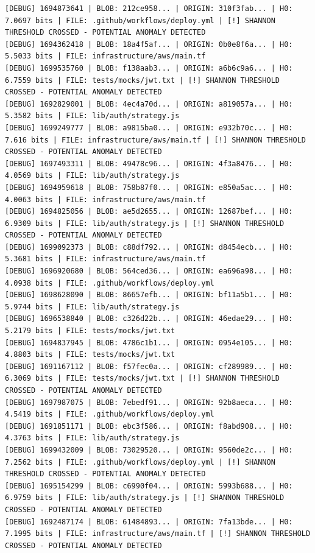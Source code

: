 \documentclass[12pt, a4paper, oneside]{report}
\begin{document}
\begin{lstlisting}[basicstyle=\tiny\ttfamily]
[DEBUG] 1694873641 | BLOB: 212ce958... | ORIGIN: 310f3fab... | H0: 7.0697 bits | FILE: .github/workflows/deploy.yml | [!] SHANNON THRESHOLD CROSSED - POTENTIAL ANOMALY DETECTED
[DEBUG] 1694362418 | BLOB: 18a4f5af... | ORIGIN: 0b0e8f6a... | H0: 5.5033 bits | FILE: infrastructure/aws/main.tf
[DEBUG] 1699535760 | BLOB: f138aab3... | ORIGIN: a6b6c9a6... | H0: 6.7559 bits | FILE: tests/mocks/jwt.txt | [!] SHANNON THRESHOLD CROSSED - POTENTIAL ANOMALY DETECTED
[DEBUG] 1692829001 | BLOB: 4ec4a70d... | ORIGIN: a819057a... | H0: 5.3582 bits | FILE: lib/auth/strategy.js
[DEBUG] 1699249777 | BLOB: a9815ba0... | ORIGIN: e932b70c... | H0: 7.616 bits | FILE: infrastructure/aws/main.tf | [!] SHANNON THRESHOLD CROSSED - POTENTIAL ANOMALY DETECTED
[DEBUG] 1697493311 | BLOB: 49478c96... | ORIGIN: 4f3a8476... | H0: 4.0569 bits | FILE: lib/auth/strategy.js
[DEBUG] 1694959618 | BLOB: 758b87f0... | ORIGIN: e850a5ac... | H0: 4.0063 bits | FILE: infrastructure/aws/main.tf
[DEBUG] 1694825056 | BLOB: ae5d2655... | ORIGIN: 12687bef... | H0: 6.9309 bits | FILE: lib/auth/strategy.js | [!] SHANNON THRESHOLD CROSSED - POTENTIAL ANOMALY DETECTED
[DEBUG] 1699092373 | BLOB: c88df792... | ORIGIN: d8454ecb... | H0: 5.3681 bits | FILE: infrastructure/aws/main.tf
[DEBUG] 1696920680 | BLOB: 564ced36... | ORIGIN: ea696a98... | H0: 4.0938 bits | FILE: .github/workflows/deploy.yml
[DEBUG] 1698628090 | BLOB: 86657efb... | ORIGIN: bf11a5b1... | H0: 5.9744 bits | FILE: lib/auth/strategy.js
[DEBUG] 1696538840 | BLOB: c326d22b... | ORIGIN: 46edae29... | H0: 5.2179 bits | FILE: tests/mocks/jwt.txt
[DEBUG] 1694837945 | BLOB: 4786c1b1... | ORIGIN: 0954e105... | H0: 4.8803 bits | FILE: tests/mocks/jwt.txt
[DEBUG] 1691167112 | BLOB: f57fec0a... | ORIGIN: cf289989... | H0: 6.3069 bits | FILE: tests/mocks/jwt.txt | [!] SHANNON THRESHOLD CROSSED - POTENTIAL ANOMALY DETECTED
[DEBUG] 1697987075 | BLOB: 7ebedf91... | ORIGIN: 92b8aeca... | H0: 4.5419 bits | FILE: .github/workflows/deploy.yml
[DEBUG] 1691851171 | BLOB: ebc3f586... | ORIGIN: f8abd908... | H0: 4.3763 bits | FILE: lib/auth/strategy.js
[DEBUG] 1699432009 | BLOB: 73029520... | ORIGIN: 9560de2c... | H0: 7.2562 bits | FILE: .github/workflows/deploy.yml | [!] SHANNON THRESHOLD CROSSED - POTENTIAL ANOMALY DETECTED
[DEBUG] 1695154299 | BLOB: c6990f04... | ORIGIN: 5993b688... | H0: 6.9759 bits | FILE: lib/auth/strategy.js | [!] SHANNON THRESHOLD CROSSED - POTENTIAL ANOMALY DETECTED
[DEBUG] 1692487174 | BLOB: 61484893... | ORIGIN: 7fa13bde... | H0: 7.1995 bits | FILE: infrastructure/aws/main.tf | [!] SHANNON THRESHOLD CROSSED - POTENTIAL ANOMALY DETECTED

\end{lstlisting}
\end{document}
